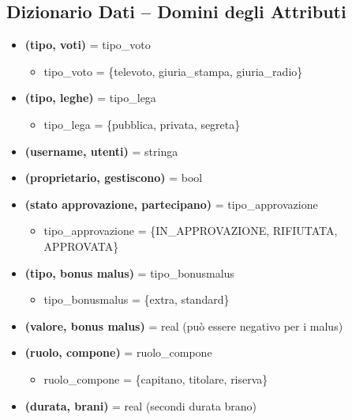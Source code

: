 \documentclass[a4paper,12pt]{article}
\begin{document}
\subsection{Dizionario Dati – Domini degli Attributi}
	\begin{itemize}
		\item \textbf{(tipo, voti)} = tipo\_voto
		\begin{itemize}
			\item tipo\_voto = \{televoto, giuria\_stampa, giuria\_radio\}
		\end{itemize}
		
		\item \textbf{(tipo, leghe)} = tipo\_lega
		\begin{itemize}
			\item tipo\_lega = \{pubblica, privata, segreta\}
		\end{itemize}
		
		\item \textbf{(username, utenti)} = stringa
		
		\item \textbf{(proprietario, gestiscono)} = bool
		
		\item \textbf{(stato approvazione, partecipano)} = tipo\_approvazione
		\begin{itemize}
			\item tipo\_approvazione = \{IN\_APPROVAZIONE, RIFIUTATA, APPROVATA\}
		\end{itemize}
		
		\item \textbf{(tipo, bonus malus)} = tipo\_bonusmalus
		\begin{itemize}
			\item tipo\_bonusmalus = \{extra, standard\}
		\end{itemize}
		
		\item \textbf{(valore, bonus malus)} = real (può essere negativo per i malus)
		
		\item \textbf{(ruolo, compone)} = ruolo\_compone
		\begin{itemize}
			\item ruolo\_compone = \{capitano, titolare, riserva\}
		\end{itemize}
		
		\item \textbf{(durata, brani)} = real (secondi durata brano)
	\end{itemize}
\newpage
\end{document}
